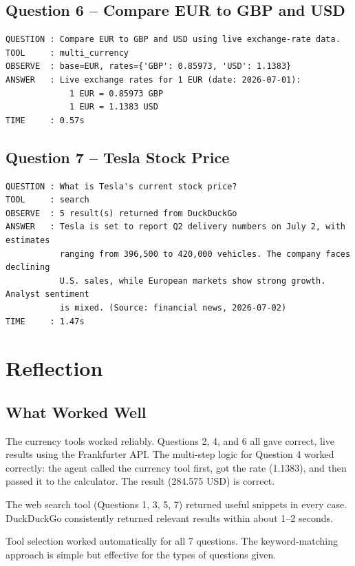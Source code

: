 \documentclass[11pt,a4paper]{article}
\begin{document}
\subsection{Question 6 -- Compare EUR to GBP and USD}

\begin{lstlisting}
QUESTION : Compare EUR to GBP and USD using live exchange-rate data.
TOOL     : multi_currency
OBSERVE  : base=EUR, rates={'GBP': 0.85973, 'USD': 1.1383}
ANSWER   : Live exchange rates for 1 EUR (date: 2026-07-01):
             1 EUR = 0.85973 GBP
             1 EUR = 1.1383 USD
TIME     : 0.57s
\end{lstlisting}

\subsection{Question 7 -- Tesla Stock Price}

\begin{lstlisting}
QUESTION : What is Tesla's current stock price?
TOOL     : search
OBSERVE  : 5 result(s) returned from DuckDuckGo
ANSWER   : Tesla is set to report Q2 delivery numbers on July 2, with estimates
           ranging from 396,500 to 420,000 vehicles. The company faces declining
           U.S. sales, while European markets show strong growth. Analyst sentiment
           is mixed. (Source: financial news, 2026-07-02)
TIME     : 1.47s
\end{lstlisting}

\section{Reflection}

\subsection{What Worked Well}

The currency tools worked reliably. Questions 2, 4, and 6 all gave correct, live results using the Frankfurter API. The multi-step logic for Question 4 worked correctly: the agent called the currency tool first, got the rate (1.1383), and then passed it to the calculator. The result (284.575 USD) is correct.

The web search tool (Questions 1, 3, 5, 7) returned useful snippets in every case. DuckDuckGo consistently returned relevant results within about 1--2 seconds.

Tool selection worked automatically for all 7 questions. The keyword-matching approach is simple but effective for the types of questions given.
\end{document}
